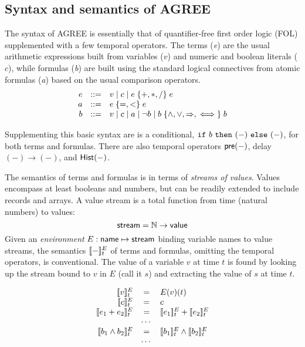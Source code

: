 \subsection{Syntax and semantics of AGREE}
\label{agree-semantics}

The syntax of AGREE is essentially that of quantifier-free first order
logic (FOL) supplemented with a few temporal operators. The terms
(\emph{e}) are the usual arithmetic expressions built from variables
($v$) and numeric and boolean literals ($c$), while formulas
(\emph{b}) are built using the standard logical connectives from
atomic formulas (\emph{a}) based on the usual comparison operators.
\[
\begin{array}{rcl}
e & ::= & v \mid c \mid e \;\{ {+,*,/} \}\; e \\
a & ::= & e\; \{ {=,<} \}\; e \\
b & ::= & v \mid c \mid a \mid \neg b
            \mid b \; \{ {\land,\lor,\Rightarrow,\iff} \}\; b
\end{array}
\]

Supplementing this basic syntax are is a conditional,
$\mbox{$\mathtt{if}\ {b}\ \mathtt{then}\ {(-)}\ \mathtt{else}\ {(-)}$}$, for both terms and formulas. There are also
temporal operators $\mathsf{pre}(-)$, delay $(-) \to (-)$, and
$\mathsf{Hist}(-)$.

The semantics of terms and formulas is in terms of \emph{streams of
values}. Values encompass at least booleans and numbers, but can be
readily extended to include records and arrays. A value stream is a
total function from time (natural numbers) to values:
\[
 \mathsf{stream} = \mathbb{N} \to \mathsf{value}
\]
Given an \emph{environment} $E : \mathsf{name} \mapsto \mathsf{stream}$
binding variable names to value streams, the semantics $[\![ - ]\!]^E_t$
of terms and formulas, omitting the temporal operators, is
conventional. The value of a variable $v$ at time $t$ is found by
looking up the stream bound to $v$ in $E$ (call it $s$) and extracting
the value of $s$ at time $t$.

\[
\begin{array}{rcl}
\sem{v}^E_t & = & E(v)(t) \\
\sem{c}^E_t & = & c \\
\sem{e_1 + e_2}^E_t & = & \sem{e_1}^E_t + \sem{e_2}^E_t \\
   & \cdots & \\
\sem{b_1 \land b_2}^E_t & = & \sem{b_1}^E_t \land \sem{b_2}^E_t \\
   & \cdots & \\
\end{array}
\]

